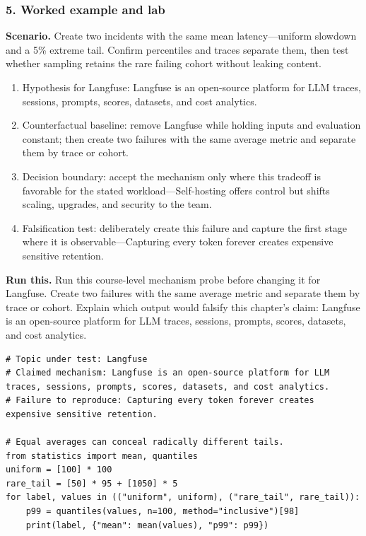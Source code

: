 \subsubsection*{5. Worked example and lab}
\textbf{Scenario.} Create two incidents with the same mean latency—uniform slowdown and a 5\% extreme tail. Confirm percentiles and traces separate them, then test whether sampling retains the rare failing cohort without leaking content.
\begin{enumerate}
\item Hypothesis for Langfuse: Langfuse is an open-source platform for LLM traces, sessions, prompts, scores, datasets, and cost analytics.
\item Counterfactual baseline: remove Langfuse while holding inputs and evaluation constant; then create two failures with the same average metric and separate them by trace or cohort.
\item Decision boundary: accept the mechanism only where this tradeoff is favorable for the stated workload—Self-hosting offers control but shifts scaling, upgrades, and security to the team.
\item Falsification test: deliberately create this failure and capture the first stage where it is observable—Capturing every token forever creates expensive sensitive retention.
\end{enumerate}
\textbf{Run this.} Run this course-level mechanism probe before changing it for Langfuse. Create two failures with the same average metric and separate them by trace or cohort. Explain which output would falsify this chapter's claim: Langfuse is an open-source platform for LLM traces, sessions, prompts, scores, datasets, and cost analytics.
\begin{Verbatim}[fontsize=\scriptsize]
# Topic under test: Langfuse
# Claimed mechanism: Langfuse is an open-source platform for LLM traces, sessions, prompts, scores, datasets, and cost analytics.
# Failure to reproduce: Capturing every token forever creates expensive sensitive retention.

# Equal averages can conceal radically different tails.
from statistics import mean, quantiles
uniform = [100] * 100
rare_tail = [50] * 95 + [1050] * 5
for label, values in (("uniform", uniform), ("rare_tail", rare_tail)):
    p99 = quantiles(values, n=100, method="inclusive")[98]
    print(label, {"mean": mean(values), "p99": p99})
\end{Verbatim}
